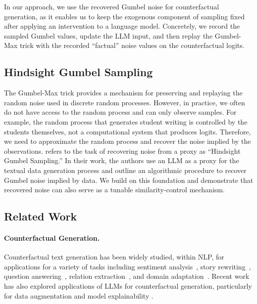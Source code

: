\documentclass[letterpaper]{article} %
\newcommand{\mh}[1]{\textcolor{teal}{\bf [Hunter: #1]}}
\begin{document}
In our approach, we use the recovered Gumbel noise for counterfactual generation, as it enables us to keep the exogenous component of sampling fixed after applying an intervention to a language model. Concretely, we record the sampled Gumbel values, update the LLM input, and then replay the Gumbel-Max trick with the recorded ``factual'' noise values on the counterfactual logits.


\subsection{Hindsight Gumbel Sampling}

The Gumbel-Max trick provides a mechanism for preserving and replaying the random noise used in discrete random processes. However, in practice, we often do not have access to the random process and can only observe samples. For example, the random process that generates student writing is controlled by the students themselves, not a computational system that produces logits. Therefore, we need to approximate the random process and recover the noise implied by the observations. \citet{ravfogel2025gumbel} refers to the task of recovering noise from a proxy as ``Hindsight Gumbel Sampling.'' In their work, the authors use an LLM as a proxy for the textual data generation process and outline an algorithmic procedure to recover Gumbel noise implied by data. We build on this foundation and demonstrate that recovered noise can also serve as a tunable similarity-control mechanism. 

\subsection{Related Work}

\paragraph{Counterfactual Generation.} Counterfactual text generation has been widely studied, within NLP, for applications for a variety of tasks including sentiment analysis~\cite{kaushik_learning_2020, madaan_generate_2021}, story rewriting~\cite{chen_unsupervised_2022}, question answering~\cite{sachdeva_catfood_2024, paranjape_retrieval-guided_2022}, relation extraction~\cite{miao_episodic_2024}, and domain adaptation~\cite{calderon_docogen_2022, wu_polyjuice_2021}. Recent work has also explored applications of LLMs for counterfactual generation, particularly for data augmentation and model explainability \cite{goethals_what_2025, zhang_dually_2025,wang_fitcf_2025,gat_faithful_2023, wen_autocad_2022}.
\end{document}
